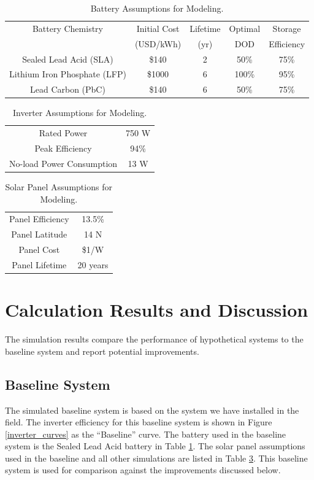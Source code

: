 \documentclass[conference]{IEEEtran}
\begin{document}
\begin{table}
\centering
\begin{tabular}{ c c c c c }
Battery Chemistry & Initial Cost & Lifetime & Optimal & Storage \\
                  & (USD/kWh)    & (yr)     & DOD     & Efficiency\\
Sealed Lead Acid (SLA)       & \$140  & 2  &  50\%  & 75\%  \\
Lithium Iron Phosphate (LFP) & \$1000 & 6  & 100\%  & 95\%  \\
Lead Carbon (PbC)            & \$140  & 6  &  50\%  & 75\%  \\
\end{tabular}
\caption{Battery Assumptions for Modeling.}
\label{table_battery_assumptions}
\end{table}

\begin{table}
\centering
\begin{tabular}{ c c }
Rated Power               & 750 W \\
Peak Efficiency           & 94\%  \\
No-load Power Consumption & 13 W  \\
\end{tabular}
\caption{Inverter Assumptions for Modeling.}
\label{tbl_inverter_assumptions}
\end{table}


\begin{table}
\centering
\begin{tabular}{ c c }
Panel Efficiency       & 13.5\% \\
Panel Latitude         & 14 N  \\
Panel Cost             & \$1/W  \\
Panel Lifetime         & 20 years \\
\end{tabular}
\caption{Solar Panel Assumptions for Modeling.}
\label{table_panel_assumptions}
\end{table}


\section{Calculation Results and Discussion}

The simulation results compare the performance of hypothetical
systems to the baseline system and report potential improvements.

\subsection{Baseline System}
The simulated baseline system is based on the system we have
installed in the field.
The inverter efficiency for this baseline system is shown in Figure
\ref{inverter_curves} as the ``Baseline'' curve.
The battery used in the baseline system is the Sealed Lead Acid
battery in Table \ref{table_battery_assumptions}.
The solar panel assumptions used in the baseline and all other
simulations are listed in Table \ref{table_panel_assumptions}.
This baseline system is used for comparison against the
improvements discussed below.
\end{document}
